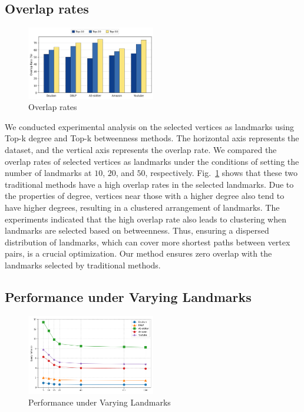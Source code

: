 \documentclass[sigconf]{acmart}
\begin{document}
\subsection{Overlap rates}
%
%
\begin{figure}
\centering
\includegraphics[width=0.5\textwidth]{figures/5-3-overlap_rates.png}
\caption{Overlap rates} 
\label{fig7}
\end{figure}
%
%
We conducted experimental analysis on the selected vertices as landmarks using Top-k degree and Top-k betweenness methods. The horizontal axis represents the dataset, and the vertical axis represents the overlap rate. We compared the overlap rates of selected vertices as landmarks under the conditions of setting the number of landmarks at $10$, $20$, and $50$, respectively. Fig.~\ref{fig7} shows that these two traditional methods have a high overlap rates in the selected landmarks. Due to the properties of degree, vertices near those with a higher degree also tend to have higher degrees, resulting in a clustered arrangement of landmarks. The experiments indicated that the high overlap rate also leads to clustering when landmarks are selected based on betweenness. Thus, ensuring a dispersed distribution of landmarks, which can cover more shortest paths between vertex pairs, is a crucial optimization. Our method ensures zero overlap with the landmarks selected by traditional methods.\par
%
%
\subsection{Performance under Varying Landmarks}
%
%
\begin{figure}
\centering
\includegraphics[width=0.5\textwidth]{figures/5-4-varylandmarks.png}
\caption{Performance under Varying Landmarks} 
\label{fig8}
\end{figure}
\end{document}
